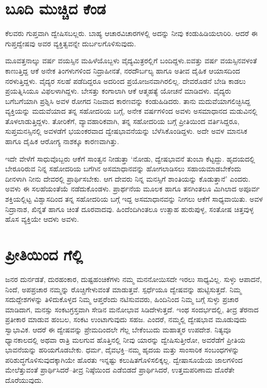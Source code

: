 \section*{ಬೂದಿ ಮುಚ್ಚಿದ ಕೆಂಡ}


ಕೆಲವರು ಗುಪ್ತವಾಗಿ ದ್ವೇಷಿಸಬಲ್ಲರು. ಬಾಹ್ಯ ಆಚಾರವಿಚಾರಗಳಲ್ಲಿ ಅದನ್ನು ನೀವು ಕಂಡು\-ಹಿಡಿಯ\-ಲಾರಿರಿ. ಆದರೆ ಈ ಗುಪ್ತದ್ವೇಷವು ಅವರ ವ್ಯಕ್ತಿತ್ವವನ್ನೇ ದುರ್ಬಲಗೊಳಿಸುವುದು.

ಮೂವತ್ತನಾಲ್ಕು ವರ್ಷ ವಯಸ್ಸಿನ ಮಹಿಳೆಯೊಬ್ಬಳು ವೈದ್ಯಮಿತ್ರರಲ್ಲಿಗೆ ಬಂದಿದ್ದಳು.\break ಐವತ್ತು ವರ್ಷ ವಯಸ್ಸಿನವಳಂತೆ ಕಾಣುತ್ತಿದ್ದ ಆಕೆ ಅನೇಕ ತಿಂಗಳುಗಳಿಂದ ನಿದ್ರಾಹೀನತೆ, ನರ\-ದೌರ್ಬಲ್ಯ ಹಾಗೂ ಅತೀವ ದೈಹಿಕ ಆಯಾಸದಿಂದ ನರಳುತ್ತಿದ್ದಳು. ವೈದ್ಯರ ಸಲಹೆ ಪಡೆದಿದ್ದರೂ ಅದರಿಂದ ಪ್ರಯೋಜನವಾಗಿರಲಿಲ್ಲ. ದೇವರೊಡನೆ ಬೇಡಿ ಕಾಡಲು ಪ್ರಯತ್ನಿಸಿಯೂ ವಿಫಲ\-ಳಾಗಿದ್ದಳು. ಬೇಸತ್ತು ಕಂಗಾಲಾಗಿ ಆಕೆ ಆತ್ಮಹತ್ಯೆ ಯೋಚನೆ ಮಾಡಿದಳು. ವೈದ್ಯರು ಬಗೆಬಗೆಯಾಗಿ ಪ್ರಶ್ನಿಸಿ ಅವಳ ರೋಗದ ನಿಜವಾದ ಕಾರಣವನ್ನು ಕಂಡುಹಿಡಿದರು. ತಾನು ಮದುವೆ\-ಯಾಗಲಿಚ್ಛಿಸಿದ್ದ ವ್ಯಕ್ತಿಯನ್ನು ಮದುವೆಯಾದ ತನ್ನ ಸಹೋದರಿಯ ಬಗ್ಗೆ, ಅನೇಕ ವರ್ಷಗಳಿಂದ ಅವಳು ಅಸಮಾಧಾನದ ಮಡುವಿನಲ್ಲಿ ತೊಳಲಾಡುತ್ತಿದ್ದಳು. ತೋರಿಕೆಗೆ, ವ್ಯಾವಹಾರಿಕವಾಗಿ, ತನ್ನ ಸಹೋದರಿಯ ಬಗ್ಗೆ ಪ್ರೀತಿಯಿಂದ ವರ್ತಿಸಿದ್ದರೂ, ಸುಪ್ತಮನಸ್ಸಿನಲ್ಲಿ ಅವಳಡೆಗೆ ಭಯಂಕರವಾದ ದ್ವೇಷಭಾವನೆಯನ್ನು ಬೆಳೆಸಿಕೊಂಡಿದ್ದಳು. ಅದೇ ಅವಳ ಮಾನಸಿಕ ಹಾಗೂ ದೈಹಿಕ ಆರೋಗ್ಯ ನಾಶಕ್ಕೂ ಕಾರಣವಾಗಿತ್ತು.

ಇದೇ ವೇಳೆಗೆ ಸಾಧುವೊಬ್ಬರು ಆಕೆಗೆ ಸಾಂತ್ವನ ನೀಡುತ್ತಾ ‘ನೋಡು, ದ್ವೇಷಭಾವನೆ ತುಂಬಾ ಕೆಟ್ಟದ್ದು. ಹೃದಯದಲ್ಲಿ ಬೇರೂರಿರುವ ನಿನ್ನ ಸಹೋದರಿಯ ಬಗೆಗಿನ ಅಸಮಾಧಾನವನ್ನು ಹೋಗಲಾಡಿಸಲು ಸಹಾಯಮಾಡಬೇಕೆಂದು ದೀನಳಾಗಿ ನೀನು ದೇವರಲ್ಲಿ ಪ್ರಾರ್ಥಿಸಬೇಕು. ಆಗ ದೇವರು ನಿನ್ನ ಮನಸ್ಸಿಗೆ ಶಾಂತಿಯನ್ನು ಕೊಡುತ್ತಾನೆ’ ಎಂದರು. ಅವಳು ಈ ಸಲಹೆಯಂತೆಯೆ ನಡೆದುಕೊಂಡಳು. ಪ್ರಾರ್ಥನೆಯ ಮೂಲಕ ಹಾಗೂ ತನಗಿಂತಲೂ ಮಿಗಿಲಾದ ಅಪೂರ್ವ ಶಕ್ತಿಯಲ್ಲಿಟ್ಟ ವಿಶ್ವಾಸದಿಂದ ತನ್ನ ಸಹೋದರಿಯ ಬಗ್ಗೆ ಇದ್ದ ಅಸಮಾಧಾನವನ್ನು ನೀಗಲು ಆಕೆಗೆ ಸಾಧ್ಯವಾಯಿತು. ಅವಳ ನಿದ್ರಾನಾಶ, ಖಿನ್ನತೆ ಹಾಗೂ ಚಿಂತೆ ದೂರವಾದವು. ಹಿಂದೆಂದಿಗಿಂತಲೂ ಉತ್ಸಾಹ ಹುರುಪುಳ್ಳ, ಸಂತೋಷ ಚಿತ್ತವುಳ್ಳ ಹೊಸ ವ್ಯಕ್ತಿಯೇ ಆದಳು ಅವಳು.


\section*{ಪ್ರೀತಿಯಿಂದ ಗೆಲ್ಲಿ}


ಜನರ ದುರ್ನಡತೆ, ದುರಹಂಕಾರ, ದುಷ್ಟಹಂಚಿಕೆಗಳು ನಮ್ಮ ಮನನೋಯಿಸದೇ ಇರಲು ಸಾಧ್ಯವಿಲ್ಲ. ಸುಳ್ಳು ಆಪಾದನೆ, ನಿಂದೆ, ಅಪಪ್ರಚಾರ ನಮ್ಮನ್ನು ರೊಚ್ಚಿಗೇಳುವಂತೆ ಮಾಡುತ್ತವೆ. ಸ್ಪರ್ಧೆಯೂ ದ್ವೇಷವನ್ನು ಹುಟ್ಟಿಸುತ್ತದೆ. ನಿಮ್ಮ ಸದುದ್ದೇಶಗಳನ್ನು ತಿಳಿದುಕೊಳ್ಳದ ನಿಮ್ಮ ಆಪ್ತರೆಂದು ನಟಿಸುವವರು, ಹಿಂದಿನಿಂದ ನಿಮ್ಮ ಬಗ್ಗೆ ಸುಳ್ಳು ಪ್ರಚಾರ ಮಾಡಿದಾಗ, ಮನಸ್ಸು ಸಂಕಟಗ್ರಸ್ತವಾಗಿ ಸೇಡಿನ ಮನೋಭಾವ ಸಿಡಿದೇಳುತ್ತದೆ. ಇಂಥ ಸಂದರ್ಭದಲ್ಲಿ, ತೀವ್ರ ತೆರನಾದ ಪ್ರತೀಕಾರ ಮಾಡುವ ಹಂಬಲ, ಸಂಕಟ ಉಂಟಾಗುವುದು ಸಹಜ. ಎಂದರೆ, ನಮ್ಮಲ್ಲಿ ದ್ವೇಷಭಾವ ಮೂಡುವುದು ಸ್ವಾಭಾವಿಕ. ಆದರೆ ಈ ದ್ವೇಷವನ್ನು ಪ್ರೇಮದಿಂದಲೇ ಗೆಲ್ಲ ಬೇಕೆಂಬುದು ಮಹಾತ್ಮರ ಉಪದೇಶ. ನಿತ್ಯವೂ ಧ್ಯಾನಕಾಲದಲ್ಲಿ ಅಥವಾ ರಾತ್ರಿ ಮಲಗುವ ಹೊತ್ತಿನಲ್ಲಿ ನೀವು ಯಾರನ್ನು ದ್ವೇಷಿಸುತ್ತೀರೋ, ಅವರೆಡೆಗೆ ಪ್ರೀತಿಯ ಭಾವನೆಯನ್ನು ಹರಿಯಗೊಡಬೇಕು. ಧರ್ಮ, ದೈವಭಕ್ತಿ–ನಮ್ಮ ಹೃದಯ ಮತ್ತು ಸಾಂಸಾರಿಕ ಸಂಬಂಧಗಳನ್ನು ಪರಿಶುದ್ಧಗೊಳಿಸುವು\-ದಕ್ಕಾಗಿಯೇ ಹೊರತು ಇನ್ನಷ್ಟು ಕಲುಷಿತಗೊಳಿಸಲಿಕ್ಕಲ್ಲ. ದ್ವೇಷಾಸೂಯೆಯ ಜಾಲಗಳಿಂದ ಮೇಲೆತ್ತುವಂತೆ ಪ್ರಾರ್ಥಿಸಿದರೆ–ತೀವ್ರ ನಿಷ್ಠೆಯಿಂದ ಎಡೆಬಿಡದೆ ಪ್ರಾರ್ಥಿಸಿದರೆ, ಉತ್ತಮ\break ಪರಿಣಾಮ ದೊರೆತೇ ದೊರೆಯುವುದು.

